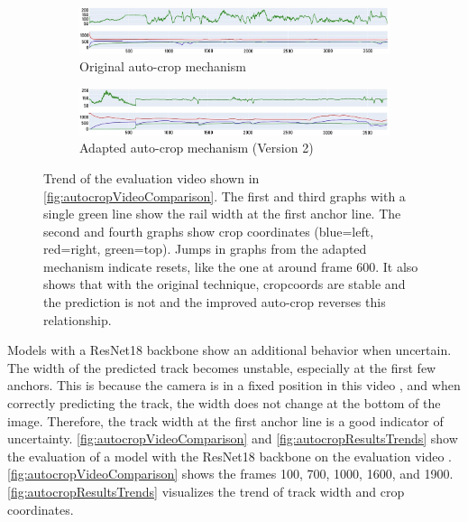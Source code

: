 \begin{figure}[H]
    \centering
    \begin{subfigure}{\textwidth}
        \centering
        \includegraphics[width=\textwidth]{PICs/experiments/autocropExperiments/original_updated.jpg} %
        \caption{Original auto-crop mechanism}
        \label{fig:autocropResultsTrends_a}
    \end{subfigure}
    \begin{subfigure}{\textwidth}
        \centering
        \includegraphics[width=\textwidth]{PICs/experiments/autocropExperiments/improved_updated.jpg} %
        \caption{Adapted auto-crop mechanism (Version 2)}
        \label{fig:autocropResultsTrends_b}
    \end{subfigure}
    \caption{Trend of the evaluation video \cite{temporalDataset_youtube_video} shown in \autoref{fig:autocropVideoComparison}.
    The first and third graphs with a single green line show the rail width at the first anchor line.
    The second and fourth graphs show crop coordinates (blue=left, red=right, green=top).
    Jumps in graphs from the adapted mechanism indicate resets, like the one at around frame 600.
    It also shows that with the original technique, cropcoords are stable and the prediction is not and the improved auto-crop reverses this relationship.}
    \label{fig:autocropResultsTrends}
\end{figure}


Models with a ResNet18 backbone show an additional behavior when uncertain.
The width of the predicted track becomes unstable, especially at the first few anchors.
This is because the camera is in a fixed position in this video \cite{temporalDataset_youtube_video}, and when correctly predicting the track, the width does not change at the bottom of the image.
Therefore, the track width at the first anchor line is a good indicator of uncertainty.
\autoref{fig:autocropVideoComparison} and \autoref{fig:autocropResultsTrends} show the evaluation of a model with the ResNet18 backbone on the evaluation video \cite{temporalDataset_youtube_video}.
\autoref{fig:autocropVideoComparison} shows the frames 100, 700, 1000, 1600, and 1900.
\autoref{fig:autocropResultsTrends} visualizes the trend of track width and crop coordinates.

